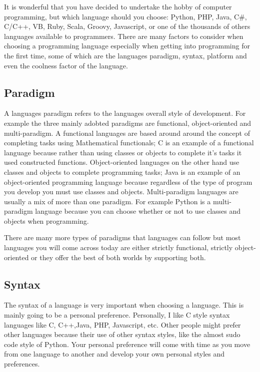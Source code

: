 It is wonderful that you have decided to undertake the hobby of computer programming, but which language should you choose: Python, PHP, Java, C\#,
C/C++, VB, Ruby, Scala, Groovy, Javascript, or one of the thousands of others languages available to programmers.
There are many factors to consider when choosing a programming language especially when getting into programming for the first time, some
of which are the languages paradigm, syntax, platform and even the coolness factor of the language.

\subsection{Paradigm}
A languages paradigm refers to the languages overall style of development.
For example the three mainly adobted paradigms are functional, object-oriented and multi-paradigm.
A functional languages are based around around the concept of completing tasks using Mathematical functionals; C is an example of
a functional language because rather than using classes or objects to complete it's tasks it used constructed functions.
Object-oriented languages on the other hand use classes and objects to complete programming tasks;
Java is an example of an object-oriented programming language because regardless of the type of program you develop you must use classes and objects.
Multi-paradigm languages are usually a mix of more than one paradigm.
For example Python is a multi-paradigm language because you can choose whether or not to use classes and objects when programming.
\par

There are many more types of paradigms that languages can follow but most languages you will come across today are either
strictly functional, strictly object-oriented or they offer the best of both worlds by supporting both.

\subsection{Syntax}
The syntax of a language is very important when choosing a language.
This is mainly going to be a personal preference.
Personally, I like C style syntax languages like C, C++,Java, PHP, Javascript, etc.
Other people might prefer other languages because their use of other syntax styles, like the almost sudo code style of Python.
Your personal preference will come with time as you move from one language to another and develop your own personal styles and preferences.

